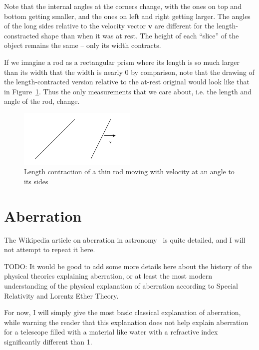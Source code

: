 \documentclass[a4paper]{article}
\theoremstyle{plain}
\theoremstyle{definition}
\newcommand{\vect}[1]{\mathbf{#1}}
\begin{document}
Note that the internal angles at the corners change, with the ones on
top and bottom getting smaller, and the ones on left and right getting
larger.  The angles of the long sides relative to the velocity vector
$\vect{v}$ are different for the length-constracted shape than when it
was at rest.  The height of each ``slice'' of the object remains the
same -- only its width contracts.

If we imagine a rod as a rectangular prism where its length is so much
larger than its width that the width is nearly 0 by comparison, note
that the drawing of the length-contracted version relative to the
at-rest original would look like that in
Figure~\ref{fig:diagonal-length-contraction-of-rod}.  Thus the only
measurements that we care about, i.e. the length and angle of the rod,
change.
\begin{figure}[ht]
	\centering
	\includegraphics[width=0.5\textwidth]{length-contraction-rod-at-angle-cropped.pdf}
	\caption{Length contraction of a thin rod moving with velocity at an angle to its sides}
	\label{fig:diagonal-length-contraction-of-rod}
\end{figure}


\section{Aberration}
\label{app:aberration}

The Wikipedia article on aberration in
astronomy~\cite{AberrationAstronomy} is quite detailed, and I will not
attempt to repeat it here.

TODO: It would be good to add some more details here about the history
of the physical theories explaining aberration, or at least the most
modern understanding of the physical explanation of aberration
according to Special Relativity and Lorentz Ether Theory.

For now, I will simply give the most basic classical explanation of
aberration, while warning the reader that this explanation does not
help explain aberration for a telescope filled with a material like
water with a refractive index significantly different than 1.
\end{document}
